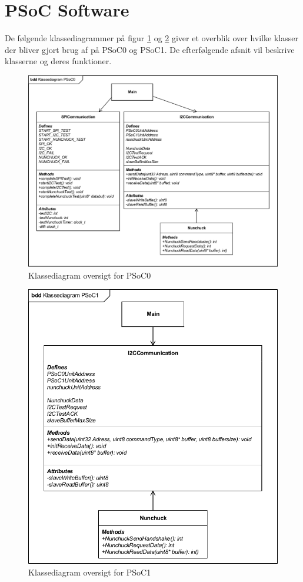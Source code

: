 \section{PSoC Software}

De følgende klassediagrammer på figur \ref{figure:klassediagramPSoC0} og \ref{figure:klassediagramPSoC1} giver et overblik over hvilke klasser der bliver gjort brug af på PSoC0 og PSoC1. De efterfølgende afsnit vil beskrive klasserne og deres funktioner.

\begin{figure}[H]
	\centering
	\includegraphics[width=.7\textwidth]{DesignOgImplementering/images/PSoC0KlassediagramOversigt}
	\caption{Klassediagram oversigt for PSoC0}
	\label{figure:klassediagramPSoC0}
\end{figure}

\begin{figure}[H]
	\centering
	\includegraphics[width=.7\textwidth]{DesignOgImplementering/images/PSoC1KlassediagramOversigt}
	\caption{Klassediagram oversigt for PSoC1}
	\label{figure:klassediagramPSoC1}
\end{figure}

